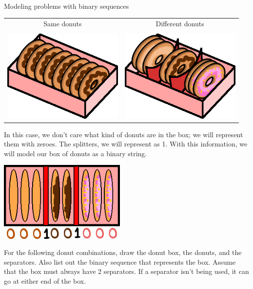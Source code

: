 {\begin{intro}{Modeling problems with binary sequences}
        \begin{center}
            \begin{tabular}{c c}
                Same donuts & 
                Different donuts
                \\ \\
                \centering
                \includegraphics[width=6cm]{images/donutbox1.png}
                &
                \includegraphics[width=6cm]{images/donutbox2.png}
            \end{tabular}
        \end{center}

        In this case, we don't care what kind of donuts are in the box;
        we will represent them with zeroes. The splitters, we will represent as 1.
        With this information, we will model our box of donuts as a binary string.

        \begin{center}
            \includegraphics[height=4cm]{images/donutbox3.png}
        \end{center}
    \end{intro}
    
    \begin{questionNOGRADE}{\thequestion}
        For the following donut combinations, draw the donut box, the donuts, and the separators.
        Also list out the binary sequence that represents the box.
        Assume that the box must always have 2 separators. If a separator isn't being used, it can
        go at either end of the box.


\end{questionNOGRADE}}
